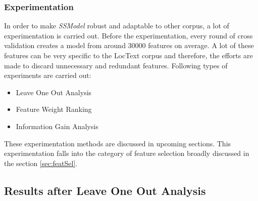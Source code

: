 \subsubsection{Experimentation}

In order to make \textit{SSModel} robust and adaptable to other corpus, a lot of experimentation is carried out. Before the experimentation, every round of cross validation creates a model from around 30000 features on average. A lot of these features can be very specific to the LocText corpus and therefore, the efforts are made to discard unnecessary and redundant features. Following types of experiments are carried out:

\begin{itemize}

\item Leave One Out Analysis

\item Feature Weight Ranking

\item Information Gain Analysis

\end{itemize}

These experimentation methods are discussed in upcoming sections. This experimentation falls into the category of feature selection broadly discussed in the section \ref{sec:featSel}.

\subsection{Results after Leave One Out Analysis}


